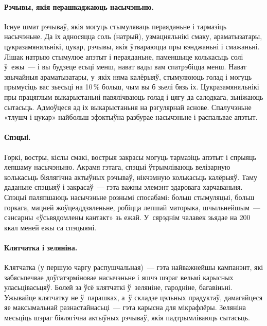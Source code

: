 \paragraph{Рэчывы, якія перашкаджаюць насычэньню.}
Існуе шмат рэчываў, якія могуць стымуляваць пераяданьне і тармазіць насычэньне. Да іх адносяцца соль (натрый), узмацняльнікі смаку, араматызатары, цукразамяняльнікі, цукар, рэчывы, якія ўтвараюцца пры вэнджаньні і смажаньні. Лішак натрыю стымулюе апэтыт і пераяданьне, паменшыце колькасьць солі ў~ежы~--- і вы будзеце есьці менш, нават вады вам спатрэбіцца менш. Нават звычайныя араматызатары, у~якіх няма калёрыяў, стымулююць голад і могуць прымусіць вас зьесьці на 10\,\% больш, чым вы б зьелі бязь іх. Цукразамяняльнікі пры працяглым выкарыстаньні павялічваюць голад і цягу да салодкага, зьніжаюць сытасьць. Адмоўцеся ад іх выкарыстаньня на рэгулярнай аснове. Спалучэньне «тлушч і цукар» найбольш эфэктыўна разбурае насычэньне і распальвае апэтыт.

\paragraph{Спэцыі.}
Горкі, востры, кіслы смакі, вострыя закрасы могуць тармазіць апэтыт і спрыяць лепшаму насычэньню. Акрамя гэтага, спэцыі ўтрымліваюць велізарную колькасьць біялягічна актыўных рэчываў, нікчэмную колькасьць калёрыяў. Таму даданьне спэцыяў і закрасаў~--- гэта важны элемэнт здаровага харчаваньня. Спэцыі паляпшаюць насычэньне рознымі спосабамі: больш стымуляцыі, больш горкага, мацней жоўцеаддзяленьне, робіцца лепшай маторыка, шчыльнейшым~--- сэнсарны «ўсьвядомлены кантакт» зь ежай. У~сярэднім чалавек зьядае на 200\,ккал меней ежы са спэцыямі.

\paragraph{Клятчатка і зеляніна.}
Клятчатка (у першую чаргу распушчальная)~--- гэта найважнейшы кампанэнт, які забясьпечвае доўгатэрміновае насычэньне і яшчэ шэраг вельмі карысных уласьцівасьцяў. Болей за ўсё клятчаткі ў~зеляніне, гародніне, багавіньні. Ужывайце клятчатку не ў~парашках, а~ў складзе цэльных прадуктаў, дамагайцеся яе максымальнай разнастайнасьці~--- гэта карысна для мікрафлёры. Зеляніна месьціць шэраг біялягічна актыўных рэчываў, якія падтрымліваюць сытасьць.


